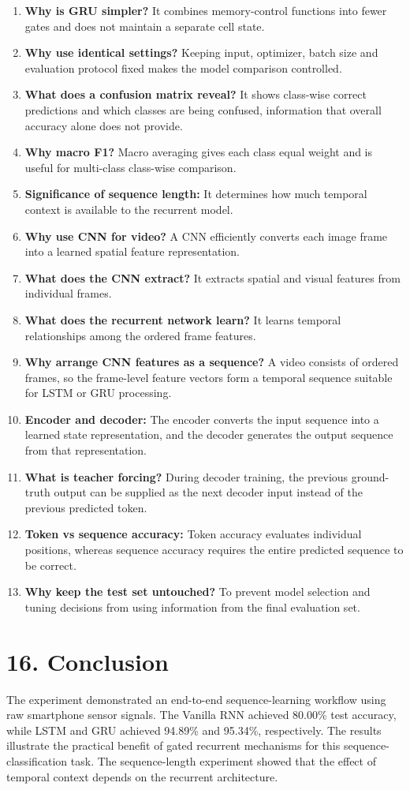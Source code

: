 \documentclass[10pt]{article}
\begin{document}
\begin{enumerate}
\item \textbf{Why is GRU simpler?} It combines memory-control functions into fewer gates and does not maintain a separate cell state.
\item \textbf{Why use identical settings?} Keeping input, optimizer, batch size and evaluation protocol fixed makes the model comparison controlled.
\item \textbf{What does a confusion matrix reveal?} It shows class-wise correct predictions and which classes are being confused, information that overall accuracy alone does not provide.
\item \textbf{Why macro F1?} Macro averaging gives each class equal weight and is useful for multi-class class-wise comparison.
\item \textbf{Significance of sequence length:} It determines how much temporal context is available to the recurrent model.
\item \textbf{Why use CNN for video?} A CNN efficiently converts each image frame into a learned spatial feature representation.
\item \textbf{What does the CNN extract?} It extracts spatial and visual features from individual frames.
\item \textbf{What does the recurrent network learn?} It learns temporal relationships among the ordered frame features.
\item \textbf{Why arrange CNN features as a sequence?} A video consists of ordered frames, so the frame-level feature vectors form a temporal sequence suitable for LSTM or GRU processing.
\item \textbf{Encoder and decoder:} The encoder converts the input sequence into a learned state representation, and the decoder generates the output sequence from that representation.
\item \textbf{What is teacher forcing?} During decoder training, the previous ground-truth output can be supplied as the next decoder input instead of the previous predicted token.
\item \textbf{Token vs sequence accuracy:} Token accuracy evaluates individual positions, whereas sequence accuracy requires the entire predicted sequence to be correct.
\item \textbf{Why keep the test set untouched?} To prevent model selection and tuning decisions from using information from the final evaluation set.
\end{enumerate}

\section*{16. Conclusion}
The experiment demonstrated an end-to-end sequence-learning workflow using raw smartphone sensor signals. The Vanilla RNN achieved 80.00\% test accuracy, while LSTM and GRU achieved 94.89\% and 95.34\%, respectively. The results illustrate the practical benefit of gated recurrent mechanisms for this sequence-classification task. The sequence-length experiment showed that the effect of temporal context depends on the recurrent architecture.
\end{document}
